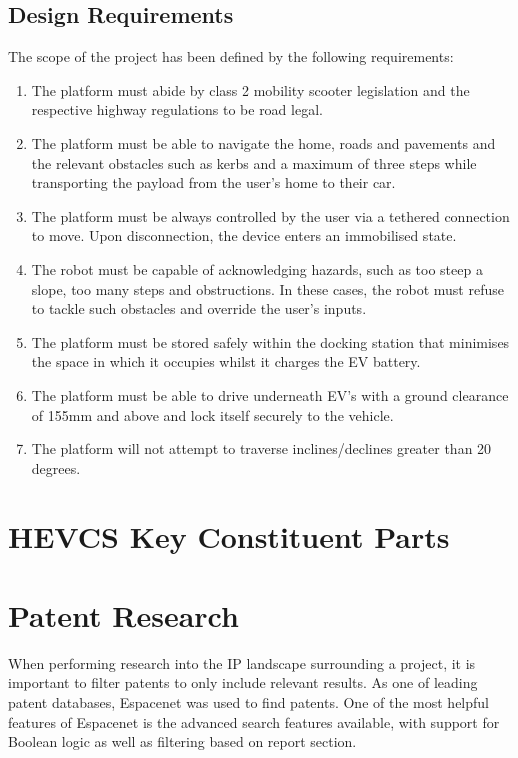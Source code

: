 \documentclass [12pt]{article}
\begin{document}
\subsection{Design Requirements}\label{sec:design_requirements}

The scope of the project has been defined by the following requirements:
\begin{enumerate}
    \item The platform must abide by class 2 mobility scooter legislation and the respective highway regulations to be road legal.
    \item The platform must be able to navigate the home, roads and pavements and the relevant obstacles such as kerbs and a maximum of three steps while transporting the payload from the user's home to their car.
    \item The platform must be always controlled by the user via a tethered connection to move. Upon disconnection, the device enters an immobilised state.
    \item The robot must be capable of acknowledging hazards, such as too steep a slope, too many steps and obstructions. In these cases, the robot must refuse to tackle such obstacles and override the user's inputs.
    \item The platform must be stored safely within the docking station that minimises the space in which it occupies whilst it charges the EV battery.
    \item The platform must be able to drive underneath EV's with a ground clearance of 155mm and above and lock itself securely to the vehicle.
    \item The platform will not attempt to traverse inclines/declines greater than 20 degrees.
  \end{enumerate}


\section{HEVCS Key Constituent Parts}\label{sec:constituent_parts}

\section{Patent Research}\label{sec:patent_research}
When performing research into the IP landscape surrounding a project, it is important to filter patents to only include relevant results. As one of leading patent databases, Espacenet was used to find patents. One of the most helpful features of Espacenet is the advanced search features available, with support for Boolean logic as well as filtering based on report section. 
\end{document}
